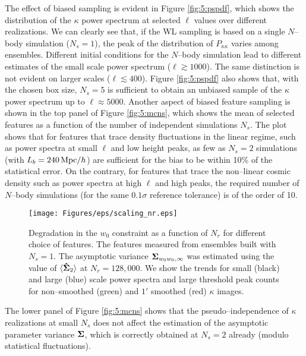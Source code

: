 %
The effect of biased sampling is evident in Figure \ref{fig:5:pspdf}, which shows the distribution of the $\kappa$ power spectrum at selected $\ell$ values over different realizations. We can clearly see that, if the WL sampling is based on a single $N$--body simulation ($N_s=1$), the peak of the distribution of $P_{\kappa\kappa}$ varies among ensembles. Different initial conditions  for the $N$--body simulation lead to different estimates of the small scale power spectrum ($\ell\gtrsim 1000$). The same distinction is not evident on larger scales ($\ell\lesssim 400$). Figure \ref{fig:5:pspdf} also shows that, with the chosen box size, $N_s=5$ is sufficient to obtain an unbiased sample of the $\kappa$ power spectrum up to $\ell\approx5000$. Another aspect of biased feature sampling is shown in the top panel of Figure \ref{fig:5:mcns}, which shows the mean of selected features as a function of the number of independent simulations $N_s$. The plot shows that for features that trace density fluctuations in the linear regime, such as power spectra at small $\ell$ and low height peaks, as few as $N_s=2$ simulations (with $L_b=240\,{\rm Mpc}/h$) are sufficient for the bias to be within 10\% of the statistical error. On the contrary, for features that trace the non--linear cosmic density such as power spectra at high $\ell$ and high peaks, the required number of $N$--body simulations (for the same $0.1\sigma$ reference tolerance) is of the order of 10.    
%
\begin{figure}
\begin{center}
\texttt{[image: Figures/eps/scaling\_nr.eps]}
\end{center}
\caption{Degradation in the $w_0$ constraint as a function of $N_r$ for different choice of features. The features measured from ensembles built with $N_s=1$. The asymptotic variance $\mathbf{\Sigma}_{w_0w_0,\infty}$ was estimated using the value of $\langle\mathbf{\hat{\Sigma}}_2\rangle$ at $N_r=128,000$. We show the trends for small (black) and large (blue) scale power spectra and large threshold peak counts for non--smoothed (green) and $1'$ smoothed (red) $\kappa$ images.}
\label{fig:5:pseudonr}
\end{figure}
%
The lower panel of Figure \ref{fig:5:mcns} shows that the pseudo--independence of $\kappa$ realizations at small $N_s$ does not affect the estimation of the asymptotic parameter variance $\mathbf{\Sigma}$, which is correctly obtained at $N_s=2$ already (modulo statistical fluctuations). 

